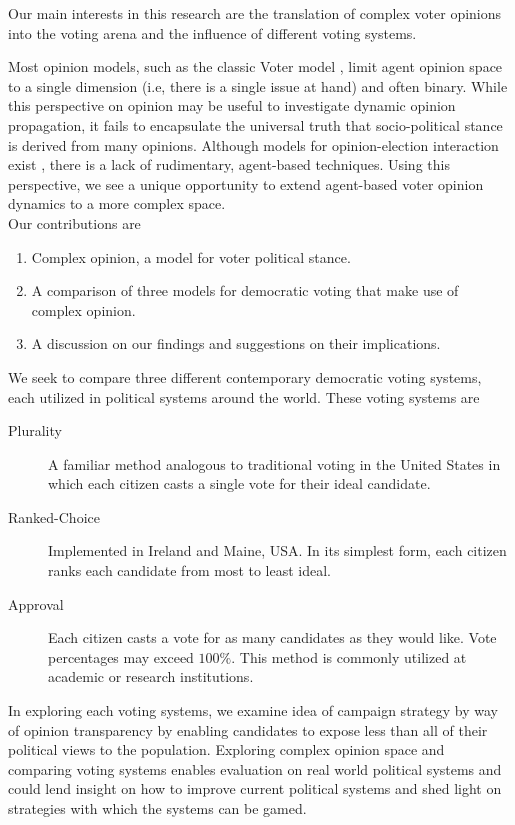 \label{sec:intro}
Our main interests in this research are the translation of complex voter opinions into 
the voting arena and the influence of different voting systems. 

Most opinion models, such as the classic Voter model \cite{votermodel}, 
limit agent opinion space to a single dimension (i.e, there is a single issue at hand) and often binary.
While this perspective on opinion may be useful to investigate dynamic opinion propagation, it fails to encapsulate the 
universal truth that socio-political stance is derived from many opinions.
Although models for opinion-election interaction exist \cite{hoyer1974comparing}, there is a lack of rudimentary, agent-based
techniques.
Using this perspective, we see a unique opportunity to extend agent-based voter opinion dynamics to a more complex space. \\
Our contributions are 
\begin{enumerate}
\item Complex opinion, a model for voter political stance. 
\item A comparison of three models for democratic voting that make use of complex opinion.
\item A discussion on our findings and suggestions on their implications.
\end{enumerate}
We seek to compare three different contemporary democratic voting systems, each utilized in political systems around the world.
These voting systems are 
\begin{description}
\item[Plurality] A familiar method analogous to traditional voting in the United States in which each citizen casts a 
single vote for their ideal candidate. 
\item[Ranked-Choice] Implemented in Ireland and Maine, USA. In its simplest form, each citizen ranks each candidate from 
    most to least ideal.
\item[Approval] Each citizen casts a vote for as many candidates as they would like. Vote percentages may exceed $100\%$.
This method is commonly utilized at academic or research institutions.
\end{description}
In exploring each voting systems, we examine idea of campaign strategy by way of opinion transparency
by enabling candidates to expose less than all of their political views to the population.\newline
\indent Exploring complex opinion space and comparing voting systems enables evaluation on real world political systems and
could lend insight on how to improve current political systems and shed light on strategies with which the systems
can be gamed. 
\\
